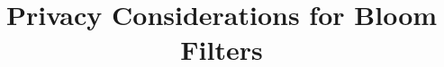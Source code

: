 %




\title{Privacy Considerations for Bloom Filters}
\date{}

\maketitle


\begin{abstract}
%
\end{abstract}




%

%
%


